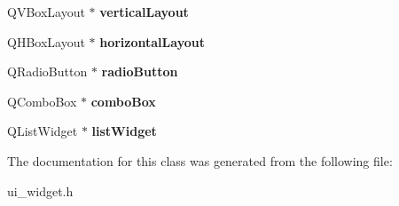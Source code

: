 \begin{DoxyCompactItemize}
\mbox{\label{classUi__Widget_a90d709ec4c756bd51a2b71274d6ce71e}} 
Q\+V\+Box\+Layout $\ast$ {\bfseries vertical\+Layout}
\item 
\mbox{\label{classUi__Widget_a3c4c8e6c2ed63a33ed25541a364310cb}} 
Q\+H\+Box\+Layout $\ast$ {\bfseries horizontal\+Layout}
\item 
\mbox{\label{classUi__Widget_a07c26b0f85454c2fa29ed5284d27938b}} 
Q\+Radio\+Button $\ast$ {\bfseries radio\+Button}
\item 
\mbox{\label{classUi__Widget_a4858b556cafdd837a3a398f62b81430c}} 
Q\+Combo\+Box $\ast$ {\bfseries combo\+Box}
\item 
\mbox{\label{classUi__Widget_a1b05fd077866cc336d7b1e0774f9b647}} 
Q\+List\+Widget $\ast$ {\bfseries list\+Widget}
\end{DoxyCompactItemize}


The documentation for this class was generated from the following file\+:\begin{DoxyCompactItemize}
\item 
ui\+\_\+widget.\+h\end{DoxyCompactItemize}

